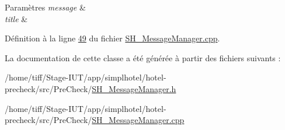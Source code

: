\begin{DoxyParams}{Paramètres}
{\em message} & \\
\hline
{\em title} & \\
\hline
\end{DoxyParams}


Définition à la ligne \hyperlink{SH__MessageManager_8cpp_source_l00049}{49} du fichier \hyperlink{SH__MessageManager_8cpp_source}{S\-H\-\_\-\-Message\-Manager.\-cpp}.




La documentation de cette classe a été générée à partir des fichiers suivants \-:\begin{DoxyCompactItemize}
\item 
/home/tiff/\-Stage-\/\-I\-U\-T/app/simplhotel/hotel-\/precheck/src/\-Pre\-Check/\hyperlink{SH__MessageManager_8h}{S\-H\-\_\-\-Message\-Manager.\-h}\item 
/home/tiff/\-Stage-\/\-I\-U\-T/app/simplhotel/hotel-\/precheck/src/\-Pre\-Check/\hyperlink{SH__MessageManager_8cpp}{S\-H\-\_\-\-Message\-Manager.\-cpp}\end{DoxyCompactItemize}

